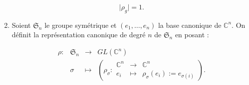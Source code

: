 \documentclass[french]{book}
\begin{document}
\begin{enumerate}
    \[
    \lvert \rho_g \rvert = 1.
    \]

    \item Soient $\mathfrak{S}_n$ le groupe symétrique et $(e_1, \dots, e_n)$ la base canonique de $\mathbb{C} ^{n}$. On définit la représentation canonique de degré $n$ de $\mathfrak{S}_n$ en posant :

    \[\begin{matrix}
    \rho : & \mathfrak{S}_n & \longrightarrow & GL(\mathbb{C} ^{n}) \\
    \ & \sigma & \longmapsto & \left( \rho _{\sigma} : \begin{matrix}
    \mathbb{C} ^{n} & \longrightarrow & \mathbb{C}^{n} \\
    e_i & \longmapsto & \rho _{\sigma}(e_i) := e _{\sigma(i)}
    \end{matrix}\right).
    \end{matrix}\]


\end{enumerate}
\end{document}
